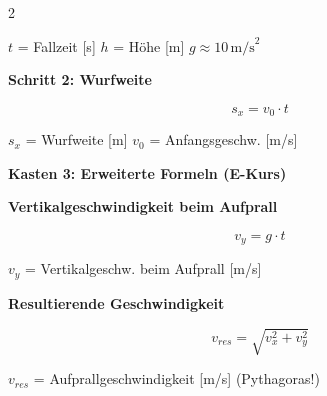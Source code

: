 \documentclass[10pt, a4paper]{article}
\newcommand{\fachfarbe}{physik}
\newcommand{\abschnitt}[1]{%
    \vspace{8pt}
    \noindent\textbf{\textcolor{\fachfarbe}{#1}}
    \vspace{4pt}
}
\begin{document}
\begin{multicols}{2}
\begin{formelbox}
\vspace{2pt}
\footnotesize
$t$ = Fallzeit [s] \quad $h$ = Höhe [m] \quad $g \approx 10\,\text{m/s}^2$
\end{formelbox}

\vspace{4pt}

\begin{formelbox}
\textbf{Schritt 2: Wurfweite}
\vspace{2pt}

\begin{equation*}
s_x = v_0 \cdot t
\end{equation*}

\vspace{2pt}
\footnotesize
$s_x$ = Wurfweite [m] \quad $v_0$ = Anfangsgeschw. [m/s]
\end{formelbox}

\vspace{4pt}


\abschnitt{Kasten 3: Erweiterte Formeln (E-Kurs)}

\begin{formelbox}
\textbf{Vertikalgeschwindigkeit beim Aufprall}
\vspace{2pt}

\begin{equation*}
v_y = g \cdot t
\end{equation*}

\vspace{2pt}
\footnotesize
$v_y$ = Vertikalgeschw. beim Aufprall [m/s]
\end{formelbox}

\vspace{4pt}

\begin{formelbox}
\textbf{Resultierende Geschwindigkeit}
\vspace{2pt}

\begin{equation*}
v_{res} = \sqrt{v_x^2 + v_y^2}
\end{equation*}

\vspace{2pt}
\footnotesize
$v_{res}$ = Aufprallgeschwindigkeit [m/s] \quad (Pythagoras!)
\end{formelbox}

\vspace{4pt}


\end{multicols}
\end{document}

